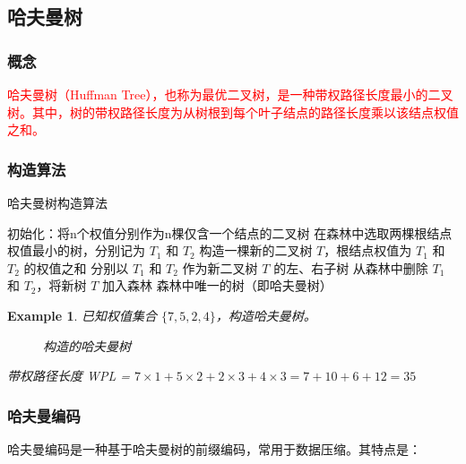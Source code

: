 \documentclass{../../note}
\newtheorem{example}{Example}
\begin{document}
\subsection{哈夫曼树}

\subsubsection{概念}
\textcolor{red}{哈夫曼树（Huffman Tree），也称为最优二叉树，是一种带权路径长度最小的二叉树。其中，树的带权路径长度为从树根到每个叶子结点的路径长度乘以该结点权值之和。}

\subsubsection{构造算法}
\begin{algorithm}
\caption{哈夫曼树构造算法}
\begin{algorithmic}[1]
    
  \State 初始化：将n个权值分别作为n棵仅含一个结点的二叉树
  \State 在森林中选取两棵根结点权值最小的树，分别记为 $T_1$ 和 $T_2$
  \State 构造一棵新的二叉树 $T$，根结点权值为 $T_1$ 和 $T_2$ 的权值之和
  \State 分别以 $T_1$ 和 $T_2$ 作为新二叉树 $T$ 的左、右子树
  \State 从森林中删除 $T_1$ 和 $T_2$，将新树 $T$ 加入森林
  \EndFor
  \State \Return 森林中唯一的树（即哈夫曼树）
  \EndProcedure
\end{algorithmic}
\end{algorithm}

\begin{example}
已知权值集合 $\{7, 5, 2, 4\}$，构造哈夫曼树。

\begin{figure}[h]
  \centering
  \caption{构造的哈夫曼树}
\end{figure}

带权路径长度 WPL = $7 \times 1 + 5 \times 2 + 2 \times 3 + 4 \times 3 = 7 + 10 + 6 + 12 = 35$
\end{example}

\subsubsection{哈夫曼编码}
哈夫曼编码是一种基于哈夫曼树的前缀编码，常用于数据压缩。其特点是：
\end{document}
